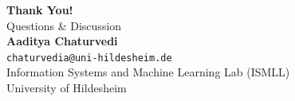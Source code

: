 \documentclass[aspectratio=169, 10pt]{beamer}
\begin{document}
\begin{frame}
\begin{center}
\vspace{1.0cm}
{\Large \textbf{Thank You!}} \\
\vspace{0.4cm}
{\large Questions \& Discussion} \\
\vspace{0.8cm}
\textbf{Aaditya Chaturvedi} \\
\small \texttt{chaturvedia@uni-hildesheim.de} \\
Information Systems and Machine Learning Lab (ISMLL) \\
University of Hildesheim
\end{center}
\end{frame}
\end{document}
